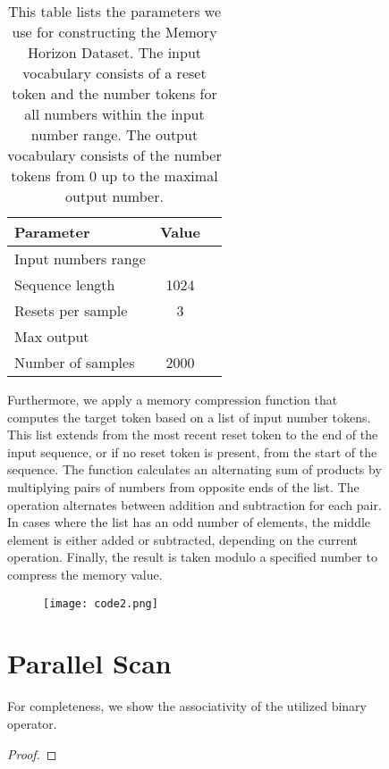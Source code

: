 \documentclass{article} \usepackage{iclr2024_conference,times}
\begin{document}
\begin{figure}[H]
\begin{minipage}{0.6\textwidth}
\begin{table}[H]
    \caption{This table lists the parameters we use for constructing the Memory Horizon Dataset. The input vocabulary consists of a reset token and the number tokens for all numbers within the input number range. The output vocabulary consists of the number tokens from 0 up to the maximal output number.}
    \centering
    \begin{tabular}{lcc}
        \toprule
        Parameter & Value \\
        \midrule
        Input numbers range &  \\
        Sequence length & 1024 \\
        Resets per sample & 3 \\
        Max output &  \\
        Number of samples & 2000 \\
        \bottomrule
    \end{tabular}
    \label{table:general_hparams}
\end{table}

Furthermore, we apply a memory compression function that computes the target token based on a list of input number tokens. This list extends from the most recent reset token to the end of the input sequence, or if no reset token is present, from the start of the sequence. The function calculates an alternating sum of products by multiplying pairs of numbers from opposite ends of the list. The operation alternates between addition and subtraction for each pair. In cases where the list has an odd number of elements, the middle element is either added or subtracted, depending on the current operation. Finally, the result is taken modulo a specified number to compress the memory value.




\begin{figure}[H]
    \centering
    \texttt{[image: code2.png]}
\end{figure}

\section{Parallel Scan}\label{sec:parallel_scan_details}

For completeness, we show the associativity of the utilized binary operator. 

\begin{proof}

\end{proof}


\end{minipage}
\end{figure}
\end{document}
